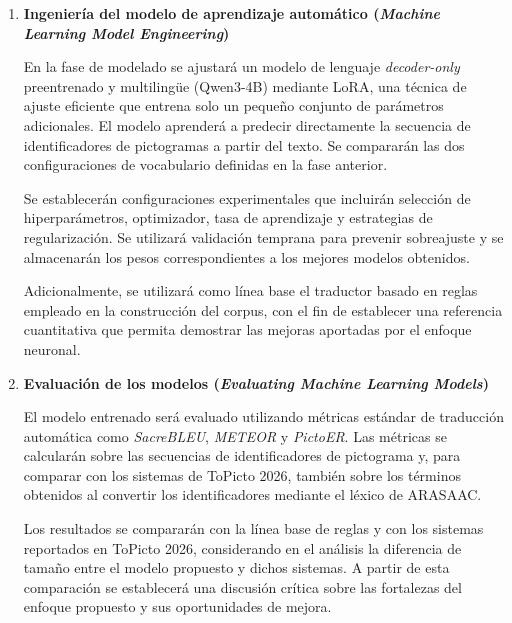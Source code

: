 \begin{enumerate}
    En paralelo, se definirá el vocabulario de salida correspondiente a los identificadores de pictogramas ARASAAC. Se estructurará el corpus en particiones de entrenamiento, validación y prueba, garantizando que todas las versiones de una misma oración (sus cinco traducciones y ambas direcciones) pertenezcan a la misma partición, para evitar filtraciones de información.

    \item \textbf{Ingeniería del modelo de aprendizaje automático (\textit{Machine Learning Model Engineering})}

    En la fase de modelado se ajustará un modelo de lenguaje \textit{decoder-only} preentrenado y multilingüe (Qwen3-4B) mediante LoRA, una técnica de ajuste eficiente que entrena solo un pequeño conjunto de parámetros adicionales. El modelo aprenderá a predecir directamente la secuencia de identificadores de pictogramas a partir del texto. Se compararán las dos configuraciones de vocabulario definidas en la fase anterior.

    Se establecerán configuraciones experimentales que incluirán selección de hiperparámetros, optimizador, tasa de aprendizaje y estrategias de regularización. Se utilizará validación temprana para prevenir sobreajuste y se almacenarán los pesos correspondientes a los mejores modelos obtenidos.

    Adicionalmente, se utilizará como línea base el traductor basado en reglas empleado en la construcción del corpus, con el fin de establecer una referencia cuantitativa que permita demostrar las mejoras aportadas por el enfoque neuronal.

    \item \textbf{Evaluación de los modelos (\textit{Evaluating Machine Learning Models})}

    El modelo entrenado será evaluado utilizando métricas estándar de traducción automática como \textit{SacreBLEU}, \textit{METEOR} y \textit{PictoER}. Las métricas se calcularán sobre las secuencias de identificadores de pictograma y, para comparar con los sistemas de ToPicto 2026, también sobre los términos obtenidos al convertir los identificadores mediante el léxico de ARASAAC.

    Los resultados se compararán con la línea base de reglas y con los sistemas reportados en ToPicto 2026, considerando en el análisis la diferencia de tamaño entre el modelo propuesto y dichos sistemas. A partir de esta comparación se establecerá una discusión crítica sobre las fortalezas del enfoque propuesto y sus oportunidades de mejora.


\end{enumerate}
